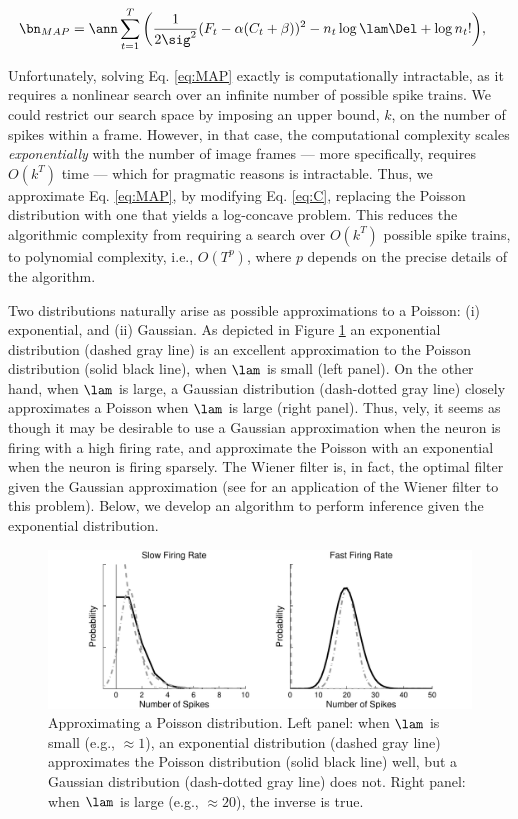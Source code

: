 \begin{align} \label{eq:MAP}
\bn_{MAP} &= \ann  \sum_{t=1}^T \bigg( \frac{1}{2 \sig^2}(F_t - \alpha(C_t + \beta))^2  -  n_t \log \lam \Del + \log n_t! \bigg), 
\end{align} 

\noindent Unfortunately, solving Eq. \eqref{eq:MAP} exactly is computationally intractable, as it requires a nonlinear search over an infinite number of  possible spike trains.  We could restrict our search space by imposing an upper bound, $k$, on the number of spikes within a frame.  However, in that case, the computational complexity scales \emph{exponentially} with the number of image frames --- more specifically, requires $O(k^T)$ time --- which for pragmatic reasons is intractable.  Thus, we approximate Eq. \eqref{eq:MAP}, by modifying Eq. \eqref{eq:C}, replacing the Poisson distribution with one that yields a log-concave problem.  This reduces the algorithmic complexity from requiring a search over $O(k^T)$ possible spike trains, to polynomial complexity, i.e., $O(T^p)$, where $p$ depends on the precise details of the algorithm.  

Two distributions naturally arise as possible approximations to a Poisson: (i) exponential, and (ii) Gaussian.  As depicted in Figure \ref{fig:dist_comp}  an exponential distribution (dashed gray line) is an excellent approximation to the Poisson distribution (solid black line), when $\lam$ is small (left panel).  On the other hand, when $\lam$ is large, a Gaussian distribution (dash-dotted gray line) closely approximates a Poisson when $\lam$ is large (right panel). Thus, \nai vely, it seems as though it may be desirable to use a Gaussian approximation when the neuron is firing with a high firing rate, and approximate the Poisson with an exponential when the neuron is firing sparsely.  The Wiener filter is, in fact, the optimal filter given the Gaussian approximation \cite{Wiener49} (see \cite{HolekampHoly08} for an application of the Wiener filter to this problem).  Below, we develop an algorithm to perform inference given the exponential distribution.  

\begin{figure}[H]
\centering \includegraphics[width=.9\linewidth]{../figs/dist_comp}
\caption{Approximating a Poisson distribution.  Left panel: when $\lam$ is small (e.g., $\approx 1$), an exponential distribution (dashed gray line) approximates the Poisson distribution (solid black line) well, but a Gaussian distribution (dash-dotted gray line) does not.  Right panel: when $\lam$ is large (e.g., $\approx 20$), the inverse is true.} \label{fig:dist_comp}
\end{figure}